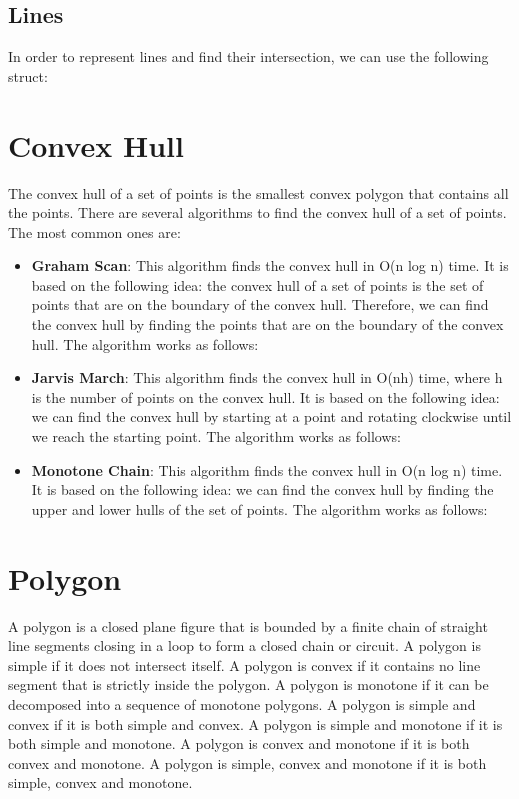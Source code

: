 


\subsection{Lines}

In order to represent lines and find their intersection, we can use the following struct:




\section{Convex Hull}

The convex hull of a set of points is the smallest convex polygon that contains all the points. There are several algorithms to find the convex hull of a set of points. The most common ones are:

\begin{itemize}
    \item \textbf{Graham Scan}: This algorithm finds the convex hull in O(n log n) time. It is based on the following idea: the convex hull of a set of points is the set of points that are on the boundary of the convex hull. Therefore, we can find the convex hull by finding the points that are on the boundary of the convex hull. The algorithm works as follows:
    
    \item \textbf{Jarvis March}: This algorithm finds the convex hull in O(nh) time, where h is the number of points on the convex hull. It is based on the following idea: we can find the convex hull by starting at a point and rotating clockwise until we reach the starting point. The algorithm works as follows:
    \item \textbf{Monotone Chain}: This algorithm finds the convex hull in O(n log n) time. It is based on the following idea: we can find the convex hull by finding the upper and lower hulls of the set of points. The algorithm works as follows:
    
\end{itemize}


\section{Polygon}

A polygon is a closed plane figure that is bounded by a finite chain of straight line segments closing in a loop to form a closed chain or circuit. A polygon is simple if it does not intersect itself. A polygon is convex if it contains no line segment that is strictly inside the polygon. A polygon is monotone if it can be decomposed into a sequence of monotone polygons. A polygon is simple and convex if it is both simple and convex. A polygon is simple and monotone if it is both simple and monotone. A polygon is convex and monotone if it is both convex and monotone. A polygon is simple, convex and monotone if it is both simple, convex and monotone.




